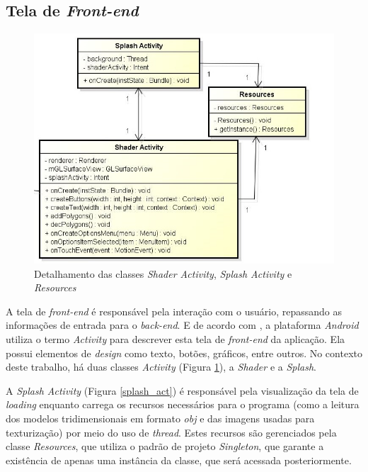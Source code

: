 \subsection{Tela de \textit{Front-end}}

	\begin{figure}[ht]
	\centering
		\includegraphics[keepaspectratio=true,scale=0.6]{figuras/shader_splash.jpg}
	\caption{Detalhamento das classes \textit{Shader Activity}, \textit{Splash Activity} e \textit{Resources}}
	\label{shader_splash}
	\end{figure}

	A tela de \textit{front-end} é responsável pela interação com o usuário, repassando as informações de entrada para o \textit{back-end}. E de acordo com \cite{androidsdkmanager}, a plataforma \textit{Android} utiliza o termo \textit{Activity} para descrever esta tela de \textit{front-end} da aplicação. Ela possui elementos de \textit{design} como texto, botões, gráficos, entre outros. No contexto deste trabalho, há duas classes \textit{Activity} (Figura \ref{shader_splash}), a \textit{Shader} e a \textit{Splash}. 

	A \textit{Splash Activity} (Figura  \ref{splash_act}) é responsável pela visualização da tela de \textit{loading} enquanto carrega os recursos necessários para o programa (como a leitura dos modelos tridimensionais em formato \textit{obj} e das imagens usadas para texturização) por meio do uso de \textit{thread}. Estes recursos são gerenciados pela classe \textit{Resources}, que utiliza o padrão de projeto \textit{Singleton}, que garante a existência de apenas uma instância da classe, que será acessada posteriormente.

